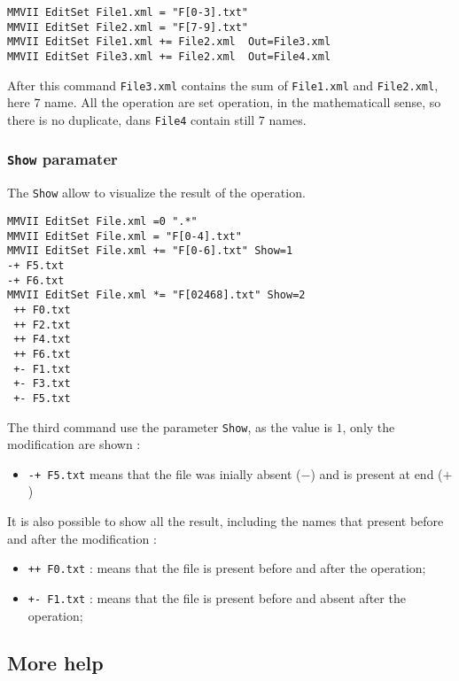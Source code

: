 \begin{verbatim}
MMVII EditSet File1.xml = "F[0-3].txt"  
MMVII EditSet File2.xml = "F[7-9].txt"  
MMVII EditSet File1.xml += File2.xml  Out=File3.xml
MMVII EditSet File3.xml += File2.xml  Out=File4.xml
\end{verbatim}

After this command {\tt File3.xml} contains the sum of {\tt File1.xml} and {\tt File2.xml},
here $7$ name. All the operation are set operation, in the mathematicall sense, so there is
no duplicate, dans {\tt File4} contain still $7$ names.


\subsubsection{{\tt Show} paramater}

The {\tt Show} allow to visualize the result of the operation.

\begin{verbatim}
MMVII EditSet File.xml =0 ".*"
MMVII EditSet File.xml = "F[0-4].txt"
MMVII EditSet File.xml += "F[0-6].txt" Show=1
-+ F5.txt
-+ F6.txt
MMVII EditSet File.xml *= "F[02468].txt" Show=2
 ++ F0.txt
 ++ F2.txt
 ++ F4.txt
 ++ F6.txt
 +- F1.txt
 +- F3.txt
 +- F5.txt
\end{verbatim}

The third command use the parameter {\tt Show}, as the value is $1$,
only the modification are shown : 

\begin{itemize}
   \item {\tt -+ F5.txt} means that the file was inially absent ($-$) and is present at end ($+$)
\end{itemize}

It is also possible to show all the result, including the names that
present before and after the modification :

\begin{itemize}
   \item {\tt ++ F0.txt} : means that the file is present before and after the operation;
   \item {\tt +- F1.txt} : means that the file is present before and absent after the operation;
\end{itemize}



\subsection{More help}

